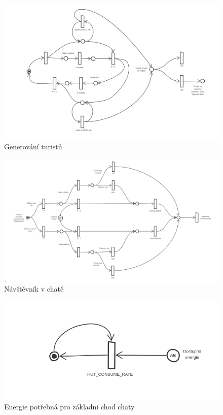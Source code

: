 \begin{figure}[H]
    \centering
    \includegraphics[width=.99\textwidth]{images/petri_net_visitors.png}\hfill
    \caption{Generování turistů}
    \label{fig:petri_net_visitors}
\end{figure}

\begin{figure}[H]
    \centering
    \includegraphics[width=.99\textwidth]{images/petri_net_visitor_in_hut.png}\hfill
    \caption{Návštěvník v chatě}
    \label{fig:petri_net_visitor_in_hut}
\end{figure}

\begin{figure}[H]
    \centering
    \includegraphics[width=.5\textwidth]{images/petri_net_hut.png}\hfill
    \caption{Energie potřebná pro základní chod chaty}
    \label{fig:petri_net_hut}
\end{figure}

